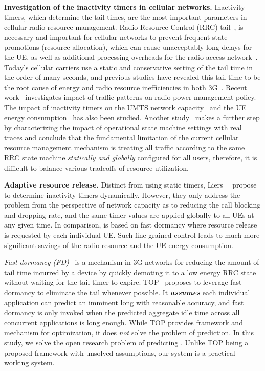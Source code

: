 \textbf{Investigation of the inactivity timers in cellular networks.} Inactivity timers, which determine the tail times, are the most important parameters in cellular radio resource management. Radio Resource Control (RRC) tail~\cite{imc.tailender}, is necessary and important for cellular networks to prevent frequent state promotions (resource allocation), which can cause unacceptably long delays for the UE, as well as additional processing overheads for the radio access network~\cite{poor, infocom_lee}. Today's cellular carriers use a static and conservative setting of the tail time in the order of many seconds, and previous studies have revealed this tail time to be the root cause of energy and radio resource inefficiencies in both 3G~\cite{imc.3g, imc.tailender, wts04, Chuah:Impacts:WCNC2002}. Recent work~\cite{falaki10_imc} investigates impact of traffic patterns on radio power management policy. The impact of inactivity timers on the UMTS network capacity~\cite{Chuah:Impacts:WCNC2002} and the UE energy consumption~\cite{Lee:Impact:WTS2004, Yeh:Energy:ITVT2009} has also been studied. Another study~\cite{imc.3g} makes a further step by characterizing the impact of operational state machine settings with real traces and conclude that the fundamental limitation of the current cellular resource management mechanism is treating all traffic according to the same RRC state machine \emph{statically and globally} configured for all users, therefore, it is difficult to balance various tradeoffs of resource utilization.

\textbf{Adaptive resource release.}
Distinct from using static timers, Liers~\etal~\cite{Liers:DynamicTimeout:PIMRC2005} propose to determine inactivity timers dynamically. %
However, they only address the problem from the perspective of network capacity as to reducing the call blocking and dropping rate, and the same timer values are applied globally to all UEs at any given time. In comparison, \NAME is based on fast dormancy where resource release is requested by each individual UE. Such fine-grained control leads to much more significant savings of the radio resource and the UE energy consumption.


{\em  Fast dormancy (FD)}~\cite{fast.dormancy.1, fast.dormancy.2} is a mechanism in 3G networks for reducing the amount of tail time incurred by a device by quickly demoting it to a low energy RRC state without waiting for the tail timer to expire. TOP~\cite{qian10_icnp} proposes to leverage fast dormancy to eliminate the tail whenever possible. It {\em \bf assumes} each individual application can predict an imminent long \IBT with reasonable accuracy, and fast dormancy is only invoked when the predicted aggregate idle time across all concurrent applications is long enough. While TOP provides framework and mechanism for optimization, it does {\em not} solve the problem of prediction. In this study, we solve the open research problem of predicting \IBTS. Unlike TOP being a proposed framework with unsolved assumptions, our system \NAME is a practical working system.


